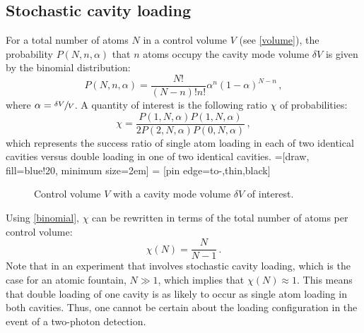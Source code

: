 \documentclass[../Thesis-IJspeert.tex]{subfiles}
\begin{document}
\graphicspath{ {"Appendices/figs/"} }

\begin{appendices}

\chapter{Stochastic cavity loading}
\label{appendixA}
For a total number of atoms $N$ in a control volume $V$ (see \autoref{volume}), the probability $P(N,n,\alpha)$ that $n$ atoms occupy the cavity mode volume $\delta V$ is given by the binomial distribution:
\begin{equation}
\label{binomial}
P(N,n,\alpha)=\frac{N!}{\left(N-n\right)!n!}\alpha^n\left(1-\alpha\right)^{N-n}\,,
\end{equation}
where $\alpha=\sfrac{\delta V}{V}$. A quantity of interest is the following ratio $\chi$ of probabilities:
\begin{equation}
\label{successratio}
\chi=\frac{P(1,N,\alpha) P(1,N,\alpha)}{2 P(2,N,\alpha) P(0,N,\alpha)}\,,
\end{equation}
which represents the success ratio of single atom loading in each of two identical cavities versus double loading in one of two identical cavities.
=[draw, fill=blue!20, minimum size=2em]
 = [pin edge={to-,thin,black}]
\begin{figure}[h]
	\centering
	\caption{Control volume $V$ with a cavity mode volume $\delta V$ of interest.}
	\label{volume}
\end{figure}
Using \autoref{binomial}, $\chi$ can be rewritten in terms of the total number of atoms per control volume:
\begin{equation}
\chi(N)=\frac{N}{N-1}\,.
\end{equation}
Note that in an experiment that involves stochastic cavity loading, which is the case for an atomic fountain, $N\gg1$, which implies that $\chi(N)\approx1$. This means that double loading of one cavity is as likely to occur as single atom loading in both cavities. Thus, one cannot be certain about the loading configuration in the event of a two-photon detection.


\end{appendices}
\end{document}
